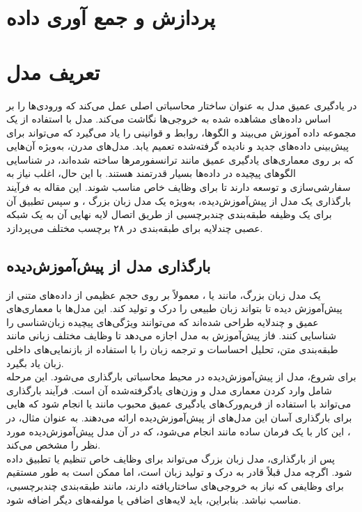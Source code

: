 \section{پردازش و جمع آوری داده}
\section{تعریف مدل}
در یادگیری عمیق مدل به عنوان ساختار محاسباتی اصلی عمل می‌کند که ورودی‌ها را بر اساس داده‌های مشاهده شده به خروجی‌ها نگاشت می‌کند. مدل با استفاده از یک مجموعه داده آموزش می‌بیند و الگوها، روابط و قوانینی را یاد می‌گیرد که می‌تواند برای پیش‌بینی داده‌های جدید و نادیده گرفته‌شده تعمیم یابد. مدل‌های مدرن، به‌ویژه آن‌هایی که بر روی معماری‌های یادگیری عمیق مانند ترانسفورمرها ساخته شده‌اند، در شناسایی الگوهای پیچیده در داده‌ها بسیار قدرتمند هستند. با این حال، اغلب نیاز به سفارشی‌سازی و توسعه دارند تا برای وظایف خاص مناسب شوند. این مقاله به فرآیند بارگذاری یک مدل از پیش‌آموزش‌دیده، به‌ویژه یک مدل زبان بزرگ ، و سپس تطبیق آن برای یک وظیفه طبقه‌بندی چند‌برچسبی از طریق اتصال لایه نهایی آن به یک شبکه عصبی چندلایه  برای طبقه‌بندی در ۲۸ برچسب مختلف می‌پردازد.
\subsection{بارگذاری مدل از پیش‌آموزش‌دیده}

یک مدل زبان بزرگ، مانند  یا ، معمولاً بر روی حجم عظیمی از داده‌های متنی از پیش‌آموزش دیده تا بتواند زبان طبیعی را درک و تولید کند. این مدل‌ها با معماری‌های عمیق و چندلایه طراحی شده‌اند که می‌توانند ویژگی‌های پیچیده زبان‌شناسی را شناسایی کنند. فاز پیش‌آموزش به مدل اجازه می‌دهد تا وظایف مختلف زبانی مانند طبقه‌بندی متن، تحلیل احساسات و ترجمه زبان را با استفاده از بازنمایی‌های داخلی زبان یاد بگیرد.
\\
برای شروع، مدل از پیش‌آموزش‌دیده در محیط محاسباتی بارگذاری می‌شود. این مرحله شامل وارد کردن معماری مدل و وزن‌های یادگرفته‌شده آن است. فرآیند بارگذاری می‌تواند با استفاده از فریم‌ورک‌های یادگیری عمیق محبوب مانند  یا  انجام شود که  هایی برای بارگذاری آسان این مدل‌های از پیش‌آموزش‌دیده ارائه می‌دهند.
به عنوان مثال، در ، این کار با یک فرمان ساده مانند  انجام می‌شود، که در آن  مدل پیش‌آموزش‌دیده مورد نظر را مشخص می‌کند.
\\
پس از بارگذاری، مدل زبان بزرگ می‌تواند برای وظایف خاص تنظیم یا تطبیق داده شود. اگرچه مدل قبلاً قادر به درک و تولید زبان است، اما ممکن است به طور مستقیم برای وظایفی که نیاز به خروجی‌های ساختاریافته دارند، مانند طبقه‌بندی چند‌برچسبی، مناسب نباشد. بنابراین، باید لایه‌های اضافی یا مولفه‌های دیگر اضافه شود.
